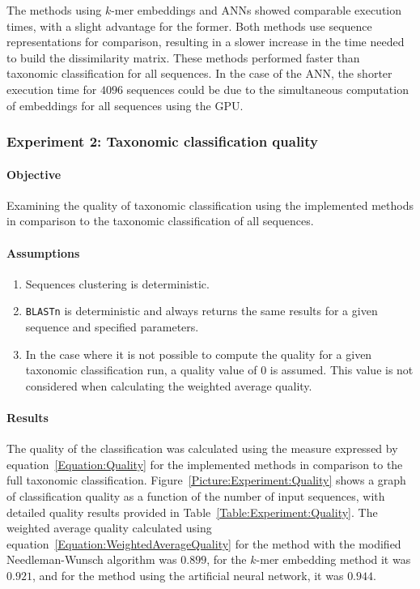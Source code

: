 \documentclass{article}
\begin{document}
                The methods using $k$-mer embeddings and ANNs showed comparable execution times, with a slight advantage for the former. Both methods use sequence representations for comparison, resulting in a slower increase in the time needed to build the dissimilarity matrix. These methods performed faster than taxonomic classification for all sequences. In the case of the ANN, the shorter execution time for $4096$ sequences could be due to the simultaneous computation of embeddings for all sequences using the GPU.

            \subsubsection{Experiment 2: Taxonomic classification quality}

                \paragraph{Objective}
                Examining the quality of taxonomic classification using the implemented methods in comparison to the taxonomic classification of all sequences.

                \paragraph{Assumptions}
                \begin{enumerate}
                    \item {
                        Sequences clustering is deterministic.
                    }
                    \item {
                        \texttt{BLASTn} is deterministic and always returns the same results for a given sequence and specified parameters.
                    }
                    \item {
                        In the case where it is not possible to compute the quality for a given taxonomic classification run, a quality value of $0$ is assumed. This value is not considered when calculating the weighted average quality.
                    }
                \end{enumerate}

                \paragraph{Results}
                The quality of the classification was calculated using the measure expressed by equation~\ref{Equation:Quality} for the implemented methods in comparison to the full taxonomic classification. Figure~\ref{Picture:Experiment:Quality} shows a graph of classification quality as a function of the number of input sequences, with detailed quality results provided in Table~\ref{Table:Experiment:Quality}. The weighted average quality calculated using equation~\ref{Equation:WeightedAverageQuality} for the method with the modified Needleman-Wunsch algorithm was $0.899$, for the $k$-mer embedding method it was $0.921$, and for the method using the artificial neural network, it was $0.944$.
\end{document}
